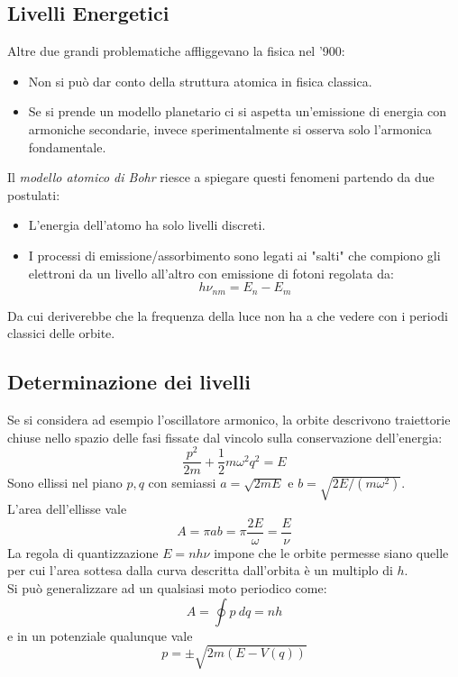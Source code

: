 \documentclass[twoside]{article}
\begin{document}
\subsection{Livelli Energetici}
Altre due grandi problematiche affliggevano la fisica nel '900:
\begin{itemize}
    \item Non si può dar conto della struttura atomica in fisica classica.
    \item Se si prende un modello planetario ci si aspetta un'emissione di energia con armoniche secondarie, invece sperimentalmente si osserva solo l'armonica fondamentale.
\end{itemize}
Il \textit{modello atomico di Bohr} riesce a spiegare questi fenomeni partendo da due postulati:
\begin{itemize}
    \item L'energia dell'atomo ha solo livelli discreti.
    \item I processi di emissione/assorbimento sono legati ai "salti" che compiono gli elettroni da un livello all'altro con emissione di fotoni regolata da:
    \begin{equation}
        h\nu_{nm}=E_n -E_m
    \end{equation}
\end{itemize}
Da cui deriverebbe che la frequenza della luce non ha a che vedere con i periodi classici delle orbite.


\subsection{Determinazione dei livelli}
Se si considera ad esempio l'oscillatore armonico, la orbite descrivono traiettorie chiuse nello spazio delle fasi fissate dal vincolo sulla conservazione dell'energia:
\begin{equation}
    \frac{p^2}{2m}+\frac{1}{2}m\omega^2 q^2 =E
\end{equation}
Sono ellissi nel piano $p,q$ con semiassi $a=\sqrt{2mE}$ e $b=\sqrt{2E/(m\omega^2)}$.
\\
L'area dell'ellisse vale
\begin{equation}
    A=\pi a b=\pi \frac{2E}{\omega}=\frac{E}{\nu}
\end{equation}
La regola di quantizzazione $E=nh\nu$ impone che le orbite permesse siano quelle per cui l'area sottesa dalla curva descritta dall'orbita è un multiplo di $h$.
\\
Si può generalizzare ad un qualsiasi moto periodico come:
\begin{equation} \label{1.4.3}
    A=\oint p \ dq = nh
\end{equation}
e in un potenziale qualunque vale
\begin{equation}
    p=\pm\sqrt{2m(E-V(q))}
\end{equation}
\end{document}
